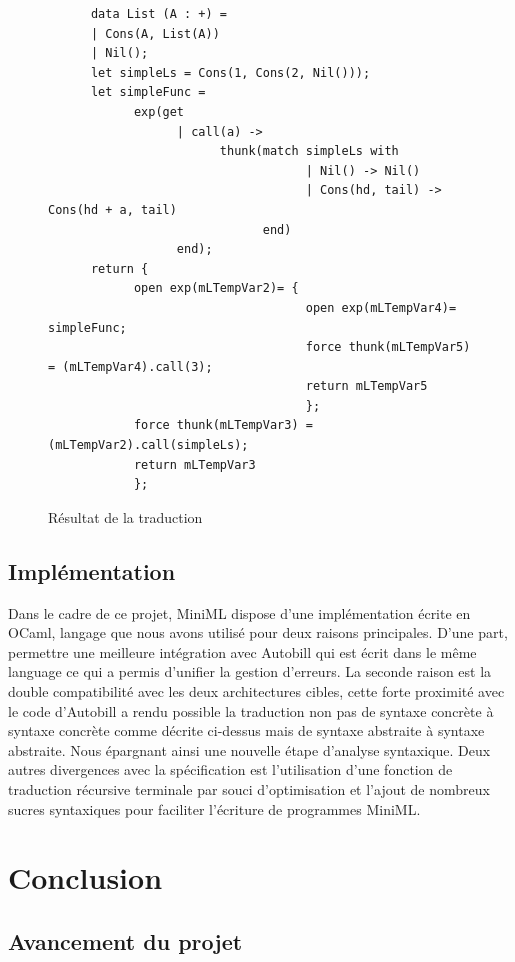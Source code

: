 \documentclass[12pt]{article}
\begin{document}
\begin{figure}[!b]
      \centering
      \begin{verbatim}
      data List (A : +) =
      | Cons(A, List(A))
      | Nil();
      let simpleLs = Cons(1, Cons(2, Nil()));
      let simpleFunc = 
            exp(get
                  | call(a) -> 
                        thunk(match simpleLs with
                                    | Nil() -> Nil()
                                    | Cons(hd, tail) -> Cons(hd + a, tail)
                              end)
                  end);
      return {
            open exp(mLTempVar2)= {
                                    open exp(mLTempVar4)= simpleFunc;
                                    force thunk(mLTempVar5) = (mLTempVar4).call(3);
                                    return mLTempVar5
                                    };
            force thunk(mLTempVar3) = (mLTempVar2).call(simpleLs);
            return mLTempVar3
            };
      \end{verbatim}
      \centering
      \caption{Résultat de la traduction}
\end{figure}

\hypertarget{Implémentation}{%
      \subsection{Implémentation}\label{Implementation}}
Dans le cadre de ce projet, MiniML dispose d'une implémentation écrite en OCaml, langage que nous avons utilisé pour deux raisons principales.
D'une part, permettre une meilleure intégration avec Autobill qui est écrit dans le même language ce qui a permis d'unifier la gestion d'erreurs.
La seconde raison est la double compatibilité avec les deux architectures cibles,
cette forte proximité avec le code d'Autobill a rendu possible la traduction non pas de syntaxe concrète à syntaxe concrète comme décrite ci-dessus mais de syntaxe abstraite à syntaxe abstraite.
Nous épargnant ainsi une nouvelle étape d'analyse syntaxique.
Deux autres divergences avec la spécification est l'utilisation d'une fonction de traduction récursive terminale par souci d'optimisation et l'ajout de nombreux sucres syntaxiques pour faciliter l'écriture de programmes MiniML.

\pagebreak

\hypertarget{conclusion}{%
      \section{Conclusion}\label{conclusion}}
\hypertarget{conclusion}{%
      \subsection{Avancement du projet}\label{Avancement du Projet}}
\end{document}
